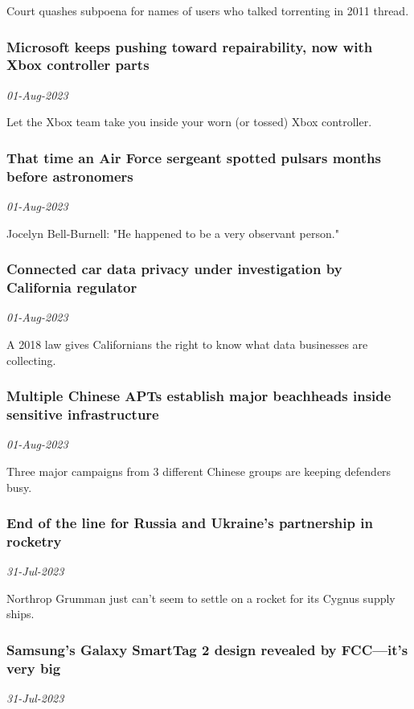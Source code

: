 Court quashes subpoena for names of users who talked torrenting in 2011 thread.
\subsubsection{Microsoft keeps pushing toward repairability, now with Xbox controller parts \href{https://arstechnica.com/?p=1958033}{}}
\textit{01-Aug-2023}

Let the Xbox team take you inside your worn (or tossed) Xbox controller.
\subsubsection{That time an Air Force sergeant spotted pulsars months before astronomers \href{https://arstechnica.com/?p=1958018}{}}
\textit{01-Aug-2023}

Jocelyn Bell-Burnell: "He happened to be a very observant person."
\subsubsection{Connected car data privacy under investigation by California regulator \href{https://arstechnica.com/?p=1958022}{}}
\textit{01-Aug-2023}

A 2018 law gives Californians the right to know what data businesses are collecting.
\subsubsection{Multiple Chinese APTs establish major beachheads inside sensitive infrastructure \href{https://arstechnica.com/?p=1958000}{}}
\textit{01-Aug-2023}

Three major campaigns from 3 different Chinese groups are keeping defenders busy.
\subsubsection{End of the line for Russia and Ukraine’s partnership in rocketry \href{https://arstechnica.com/?p=1957889}{}}
\textit{31-Jul-2023}

Northrop Grumman just can't seem to settle on a rocket for its Cygnus supply ships.
\subsubsection{Samsung’s Galaxy SmartTag 2 design revealed by FCC—it’s very big \href{https://arstechnica.com/?p=1957931}{}}
\textit{31-Jul-2023}


